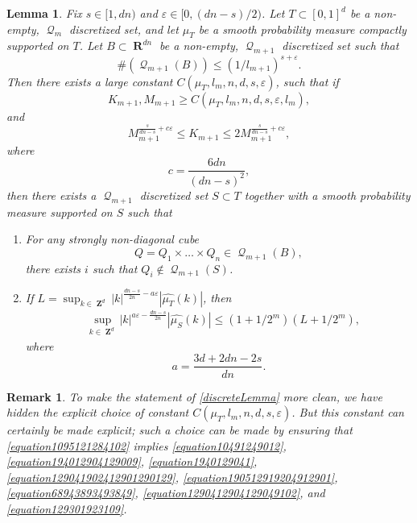 \documentclass[12pt,reqno]{article}
\numberwithin{equation}{section}
\DeclareMathOperator{\RR}{\mathbf{R}}
\DeclareMathOperator{\ZZ}{\mathbf{Z}}
\newtheorem{lemma}[theorem]{Lemma}
\newtheorem{remark}[theorem]{Remark}
\DeclareMathOperator{\DQ}{\mathcal{Q}}
\begin{document}
\begin{lemma} \label{discreteLemma}
    Fix $s \in [1,dn)$ and $\varepsilon \in [0,(dn-s)/2)$. Let $T \subset [0,1]^d$ be a non-empty, $\DQ_m$ discretized set, and let $\mu_T$ be a smooth probability measure compactly supported on $T$. Let $B \subset \RR^{dn}$ be a non-empty, $\DQ_{m+1}$ discretized set such that
    \begin{equation} \label{equation1290419204912090120912}
       \#(\DQ_{m+1}(B)) \leq (1/l_{m+1})^{s + \varepsilon}.
    \end{equation}
    Then there exists a large constant $C(\mu_T,l_m,n,d,s,\varepsilon)$, such that if
    \begin{equation} \label{equation1095121284102}
        K_{m+1}, M_{m+1} \geq C(\mu_T,l_m,n,d,s,\varepsilon,l_m),
    \end{equation}
    and
    \begin{equation} \label{equation5890129048128941891}
        M_{m+1}^{\frac{s}{dn-s} + c\varepsilon} \leq K_{m+1} \leq 2 M_{m+1}^{\frac{s}{dn-s} + c \varepsilon},
    \end{equation}
    where
    \[ c = \frac{6dn}{(dn - s)^2}, \]
    then there exists a $\DQ_{m+1}$ discretized set $S \subset T$ together with a smooth probability measure supported on $S$ such that
    \begin{enumerate}
        \item[(A)] For any strongly non-diagonal cube
        \[ Q = Q_1 \times \dots \times Q_n \in \DQ_{m+1}(B), \]
        there exists $i$ such that $Q_i \not \in \DQ_{m+1}(S)$.

        \item[(B)] If $L = \sup_{k \in \ZZ^d} |k|^{\frac{dn-s}{2n} - a\varepsilon} |\widehat{\mu_T}(k)|$, then
        \begin{align*}
            &\sup_{k \in \ZZ^d} |k|^{a\varepsilon - \frac{dn-s}{2n}} |\widehat{\mu_S}(k)| \leq (1 + 1/2^m) \left( L + 1/2^m \right),
        \end{align*}
        where
        \[ a = \frac{3d + 2dn - 2s}{dn}. \]
    \end{enumerate}
\end{lemma}

\begin{remark}
    To make the statement of \eqref{discreteLemma} more clean, we have hidden the explicit choice of constant $C(\mu_T,l_m,n,d,s,\varepsilon)$. But this constant can certainly be made explicit; such a choice can be made by ensuring that \eqref{equation1095121284102} implies \eqref{equation10491249012}, \eqref{equation194012904129009}, \eqref{equation1940129041}, \eqref{equation129041902412901290129}, \eqref{equation190512919204912901}, \eqref{equation68943893493849}, \eqref{equation1290412904129049102}, and \eqref{equation129301923109}.
\end{remark}
\end{document}
